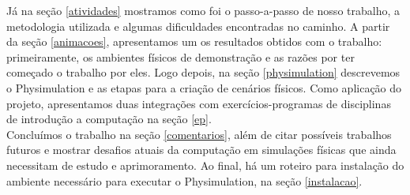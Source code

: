 Já na seção \ref{atividades} mostramos como foi o passo-a-passo de nosso trabalho, a metodologia utilizada e algumas dificuldades encontradas no caminho. A partir da seção \ref{animacoes}, apresentamos um os resultados obtidos com o trabalho: primeiramente, os ambientes físicos de demonstração e as razões por ter começado o trabalho por eles. Logo depois, na seção \ref{physimulation} descrevemos o Physimulation e as etapas para a criação de cenários físicos. Como aplicação do projeto, apresentamos duas integrações com exercícios-programas de disciplinas de introdução a computação na seção \ref{ep}. \\

Concluímos o trabalho na seção \ref{comentarios}, além de citar possíveis trabalhos futuros e mostrar desafios atuais da computação em simulações físicas que ainda necessitam de estudo e aprimoramento. Ao final, há um roteiro para instalação do ambiente necessário para executar o Physimulation, na seção \ref{instalacao}. 


